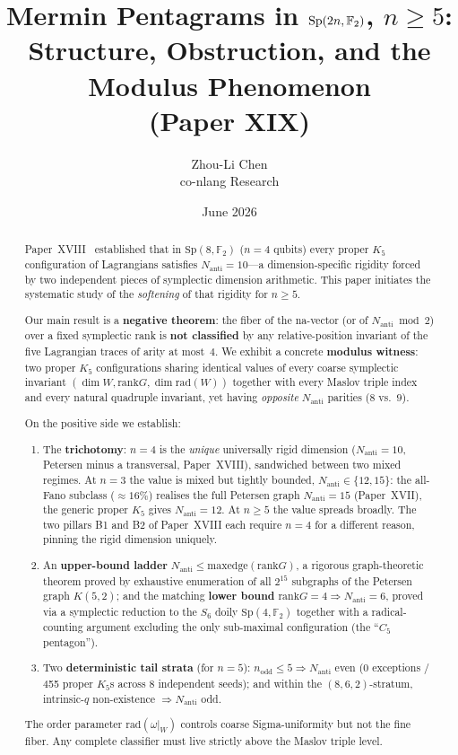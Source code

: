 \documentclass[11pt,a4paper]{article}
\title{Mermin Pentagrams in $\Sp(2n,\mathbb{F}_2)$, $n\ge 5$:\\
       Structure, Obstruction, and the Modulus Phenomenon\\
       {\large (Paper XIX)}}
\author{Zhou-Li Chen \\ co-nlang Research}
\date{June 2026}
\theoremstyle{remark}
\newcommand{\Sp}{\mathrm{Sp}}
\newcommand{\rad}{\mathrm{rad}}
\newcommand{\rank}{\mathrm{rank}}
\newcommand{\Nanti}{N_{\mathrm{anti}}}
\begin{document}
\maketitle

\begin{abstract}
Paper~XVIII~\cite{PaperXVIII} established that in $\Sp(8,\mathbb{F}_2)$ ($n=4$ qubits) every proper
$K_5$ configuration of Lagrangians satisfies $\Nanti=10$---a dimension-specific
rigidity forced by two independent pieces of symplectic dimension arithmetic.
This paper initiates the systematic study of the \emph{softening} of that rigidity
for $n\ge5$.

Our main result is a \textbf{negative theorem}: the fiber of the na-vector
(or of $\Nanti\bmod2$) over a fixed symplectic rank is \textbf{not classified}
by any relative-position invariant of the five Lagrangian traces of arity at most~$4$.
We exhibit a concrete \textbf{modulus witness}: two proper $K_5$ configurations
sharing identical values of every coarse symplectic invariant $(\dim W, \rank G,
\dim\rad(W))$ together with every Maslov triple index and every natural quadruple
invariant, yet having \emph{opposite} $\Nanti$ parities ($8$ vs.\ $9$).

On the positive side we establish:
\begin{enumerate}
\item The \textbf{trichotomy}: $n=4$ is the \emph{unique} universally rigid
  dimension ($\Nanti=10$, Petersen minus a transversal, Paper~XVIII), sandwiched
  between two mixed regimes.  At $n=3$ the value is mixed but tightly bounded,
  $\Nanti\in\{12,15\}$: the all-Fano subclass ($\approx16\%$) realises the full
  Petersen graph $\Nanti=15$ (Paper~XVII), the generic proper $K_5$ gives
  $\Nanti=12$.  At $n\ge5$ the value spreads broadly.  The two pillars B1 and B2
  of Paper~XVIII each require $n=4$ for a different reason, pinning the rigid
  dimension uniquely.
\item An \textbf{upper-bound ladder} $\Nanti\le \mathrm{maxedge}(\rank G)$, a rigorous
  graph-theoretic theorem proved by exhaustive enumeration of all $2^{15}$ subgraphs
  of the Petersen graph $K(5,2)$; and the matching \textbf{lower bound}
  $\rank G=4\Rightarrow\Nanti=6$, proved via a symplectic reduction to the $S_6$ doily
  $\Sp(4,\mathbb F_2)$ together with a radical-counting argument excluding the only
  sub-maximal configuration (the ``$C_5$ pentagon'').
\item Two \textbf{deterministic tail strata} (for $n=5$): $n_{\mathrm{odd}}\le5
  \Rightarrow\Nanti$ even (0 exceptions / 455 proper $K_5$s across 8 independent
  seeds); and within the $(8,6,2)$-stratum, intrinsic-$q$ non-existence
  $\Rightarrow\Nanti$ odd.
\end{enumerate}
The order parameter $\rad(\omega|_W)$ controls coarse Sigma-uniformity but not the
fine fiber. Any complete classifier must live strictly above the Maslov triple level.
\end{abstract}
\end{document}

